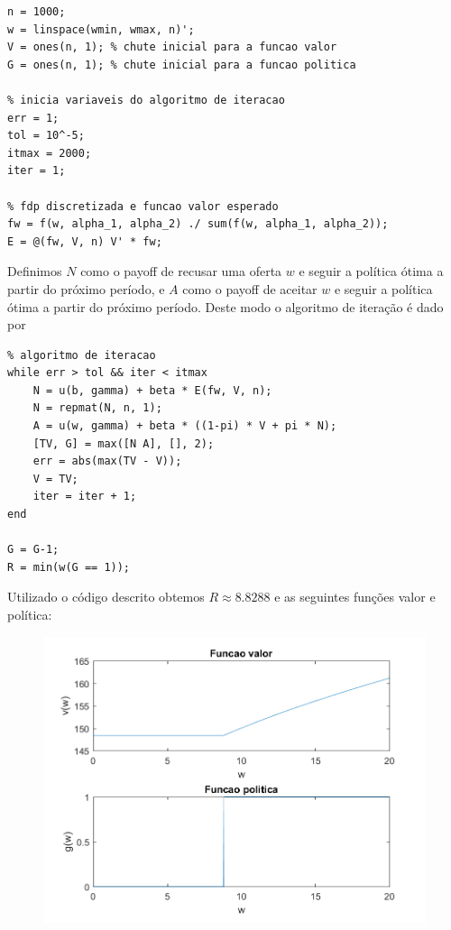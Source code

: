 \documentclass{article}
\begin{document}
\newpage
\begin{lstlisting}
n = 1000;
w = linspace(wmin, wmax, n)';
V = ones(n, 1); % chute inicial para a funcao valor
G = ones(n, 1); % chute inicial para a funcao politica

% inicia variaveis do algoritmo de iteracao
err = 1;
tol = 10^-5;
itmax = 2000;
iter = 1;

% fdp discretizada e funcao valor esperado
fw = f(w, alpha_1, alpha_2) ./ sum(f(w, alpha_1, alpha_2));
E = @(fw, V, n) V' * fw; 
\end{lstlisting}

Definimos $N$ como o payoff de recusar uma oferta $w$ e seguir a política ótima a partir do próximo período, 
e $A$ como o payoff de aceitar $w$ e seguir a política ótima a partir do próximo período. 
Deste modo o algoritmo de iteração é dado por

\begin{lstlisting}
% algoritmo de iteracao
while err > tol && iter < itmax
    N = u(b, gamma) + beta * E(fw, V, n);
    N = repmat(N, n, 1);
    A = u(w, gamma) + beta * ((1-pi) * V + pi * N);
    [TV, G] = max([N A], [], 2);
    err = abs(max(TV - V));
    V = TV;
    iter = iter + 1;
end

G = G-1;
R = min(w(G == 1));
\end{lstlisting}

Utilizado o código descrito obtemos $R \approx 8.8288$ e as seguintes funções valor e política:

\begin{figure}[!h]
  \includegraphics{ex1_1.png}
\end{figure}
\end{document}
